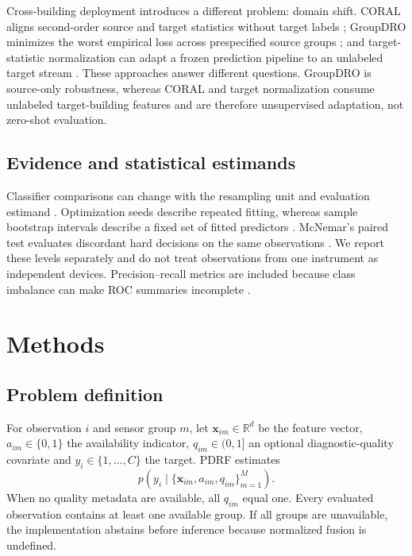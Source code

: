 \documentclass[11pt]{article}
\begin{document}
Cross-building deployment introduces a different problem: domain shift. CORAL aligns second-order source and target statistics without target labels \citep{sun2016coral}; GroupDRO minimizes the worst empirical loss across prespecified source groups \citep{sagawa2020groupdro}; and target-statistic normalization can adapt a frozen prediction pipeline to an unlabeled target stream \citep{mirza2022normalization}. These approaches answer different questions. GroupDRO is source-only robustness, whereas CORAL and target normalization consume unlabeled target-building features and are therefore unsupervised adaptation, not zero-shot evaluation.

\subsection{Evidence and statistical estimands}

Classifier comparisons can change with the resampling unit and evaluation estimand \citep{dietterich1998tests,demsar2006statistical}. Optimization seeds describe repeated fitting, whereas sample bootstrap intervals describe a fixed set of fitted predictors \citep{efron1994bootstrap}. McNemar's paired test evaluates discordant hard decisions on the same observations \citep{mcnemar1947correlated}. We report these levels separately and do not treat observations from one instrument as independent devices. Precision--recall metrics are included because class imbalance can make ROC summaries incomplete \citep{saito2015precision}.

\section{Methods}

\subsection{Problem definition}

For observation $i$ and sensor group $m$, let $\mathbf{x}_{im}\in\mathbb{R}^{d}$ be the feature vector, $a_{im}\in\{0,1\}$ the availability indicator, $q_{im}\in(0,1]$ an optional diagnostic-quality covariate and $y_i\in\{1,\ldots,C\}$ the target. PDRF estimates
\begin{equation}
p\!\left(y_i\mid\{\mathbf{x}_{im},a_{im},q_{im}\}_{m=1}^{M}\right).
\end{equation}
When no quality metadata are available, all $q_{im}$ equal one. Every evaluated observation contains at least one available group. If all groups are unavailable, the implementation abstains before inference because normalized fusion is undefined.
\end{document}
